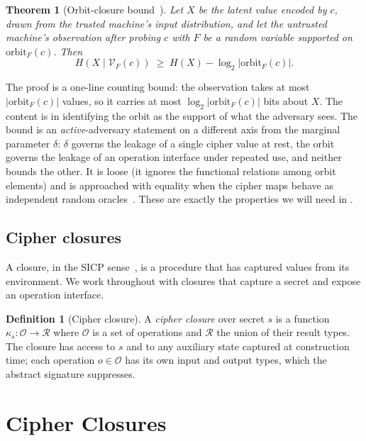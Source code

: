\documentclass[11pt]{article}
\theoremstyle{definition}
\newtheorem{definition}{Definition}[section]
\theoremstyle{plain}
\newtheorem{theorem}{Theorem}[section]
\theoremstyle{definition}
\theoremstyle{remark}
\newcommand{\orbitF}{\mathrm{orbit}_F}
\begin{document}
\begin{theorem}[Orbit-closure bound~{\cite[Thm.~5.3]{towell2026algebraic}}]
\label{thm:orbit-bound}
Let $X$ be the latent value encoded by $c$, drawn from the trusted
machine's input distribution, and let the untrusted machine's
observation after probing $c$ with $F$ be a random variable supported
on $\orbitF(c)$. Then
\[
H(X \mid \mathcal{V}_F(c)) \;\geq\; H(X) - \log_2 |\orbitF(c)|.
\]
\end{theorem}

The proof is a one-line counting bound: the observation takes at most
$|\orbitF(c)|$ values, so it carries at most $\log_2 |\orbitF(c)|$ bits
about $X$. The content is in identifying the orbit as the support of
what the adversary sees. The bound is an \emph{active}-adversary
statement on a different axis from the marginal parameter $\delta$:
$\delta$ governs the leakage of a single cipher value at rest, the
orbit governs the leakage of an operation interface under repeated
use, and neither bounds the other. It is loose (it ignores the
functional relations among orbit elements) and is approached with
equality when the cipher maps behave as independent random
oracles~\cite{bellare1993random}. These are exactly the properties we
will need in .

\subsection{Cipher closures}

A closure, in the SICP sense~\cite{abelson1996sicp}, is a procedure
that has captured values from its environment. We work throughout with
closures that capture a secret and expose an operation interface.

\begin{definition}[Cipher closure]
\label{def:cipher-closure}
A \emph{cipher closure} over secret $s$ is a function $\kappa_s :
\mathcal{O} \to \mathcal{R}$ where $\mathcal{O}$ is a set of operations
and $\mathcal{R}$ the union of their result types. The closure has
access to $s$ and to any auxiliary state captured at construction time;
each operation $o \in \mathcal{O}$ has its own input and output types,
which the abstract signature suppresses.
\end{definition}

\section{Cipher Closures}
\label{sec:closures}
\end{document}
